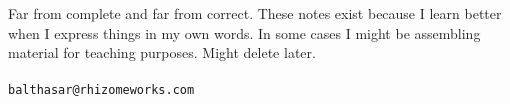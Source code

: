 \documentclass[openright,twoside,10pt]{book}
\begin{document}
Far from complete and far from correct. These notes exist because I learn better when I express things in my own words. In some cases I might be assembling material for teaching purposes. Might delete later.\\
\\
\texttt{balthasar@rhizomeworks.com}











\tableofcontents
\end{document}
